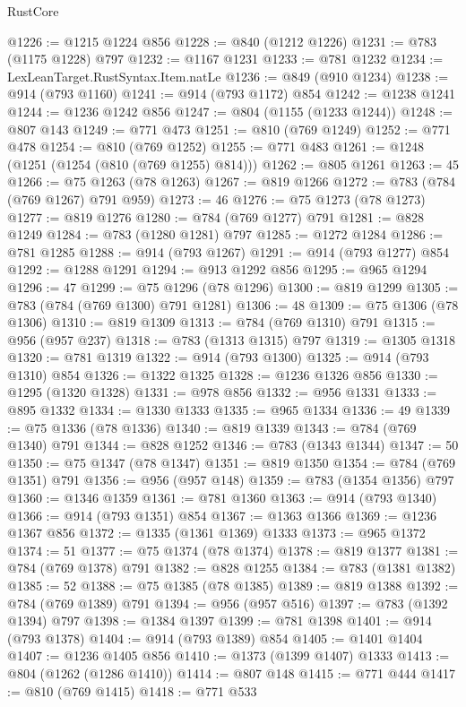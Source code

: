 \begin{lexlean}{RustCore}
\begin{coremodule}
@1226 := @1215 @1224 @856
@1228 := @840 (@1212 @1226)
@1231 := @783 (@1175 @1228) @797
@1232 := @1167 @1231
@1233 := @781 @1232
@1234 := LexLeanTarget.RustSyntax.Item.natLe
@1236 := @849 (@910 @1234)
@1238 := @914 (@793 @1160)
@1241 := @914 (@793 @1172) @854
@1242 := @1238 @1241
@1244 := @1236 @1242 @856
@1247 := @804 (@1155 (@1233 @1244))
@1248 := @807 @143
@1249 := @771 @473
@1251 := @810 (@769 @1249)
@1252 := @771 @478
@1254 := @810 (@769 @1252)
@1255 := @771 @483
@1261 := @1248 (@1251 (@1254 (@810 (@769 @1255) @814)))
@1262 := @805 @1261
@1263 := 45
@1266 := @75 @1263 (@78 @1263)
@1267 := @819 @1266
@1272 := @783 (@784 (@769 @1267) @791 @959)
@1273 := 46
@1276 := @75 @1273 (@78 @1273)
@1277 := @819 @1276
@1280 := @784 (@769 @1277) @791
@1281 := @828 @1249
@1284 := @783 (@1280 @1281) @797
@1285 := @1272 @1284
@1286 := @781 @1285
@1288 := @914 (@793 @1267)
@1291 := @914 (@793 @1277) @854
@1292 := @1288 @1291
@1294 := @913 @1292 @856
@1295 := @965 @1294
@1296 := 47
@1299 := @75 @1296 (@78 @1296)
@1300 := @819 @1299
@1305 := @783 (@784 (@769 @1300) @791 @1281)
@1306 := 48
@1309 := @75 @1306 (@78 @1306)
@1310 := @819 @1309
@1313 := @784 (@769 @1310) @791
@1315 := @956 (@957 @237)
@1318 := @783 (@1313 @1315) @797
@1319 := @1305 @1318
@1320 := @781 @1319
@1322 := @914 (@793 @1300)
@1325 := @914 (@793 @1310) @854
@1326 := @1322 @1325
@1328 := @1236 @1326 @856
@1330 := @1295 (@1320 @1328)
@1331 := @978 @856
@1332 := @956 @1331
@1333 := @895 @1332
@1334 := @1330 @1333
@1335 := @965 @1334
@1336 := 49
@1339 := @75 @1336 (@78 @1336)
@1340 := @819 @1339
@1343 := @784 (@769 @1340) @791
@1344 := @828 @1252
@1346 := @783 (@1343 @1344)
@1347 := 50
@1350 := @75 @1347 (@78 @1347)
@1351 := @819 @1350
@1354 := @784 (@769 @1351) @791
@1356 := @956 (@957 @148)
@1359 := @783 (@1354 @1356) @797
@1360 := @1346 @1359
@1361 := @781 @1360
@1363 := @914 (@793 @1340)
@1366 := @914 (@793 @1351) @854
@1367 := @1363 @1366
@1369 := @1236 @1367 @856
@1372 := @1335 (@1361 @1369) @1333
@1373 := @965 @1372
@1374 := 51
@1377 := @75 @1374 (@78 @1374)
@1378 := @819 @1377
@1381 := @784 (@769 @1378) @791
@1382 := @828 @1255
@1384 := @783 (@1381 @1382)
@1385 := 52
@1388 := @75 @1385 (@78 @1385)
@1389 := @819 @1388
@1392 := @784 (@769 @1389) @791
@1394 := @956 (@957 @516)
@1397 := @783 (@1392 @1394) @797
@1398 := @1384 @1397
@1399 := @781 @1398
@1401 := @914 (@793 @1378)
@1404 := @914 (@793 @1389) @854
@1405 := @1401 @1404
@1407 := @1236 @1405 @856
@1410 := @1373 (@1399 @1407) @1333
@1413 := @804 (@1262 (@1286 @1410))
@1414 := @807 @148
@1415 := @771 @444
@1417 := @810 (@769 @1415)
@1418 := @771 @533

\end{coremodule}
\end{lexlean}

